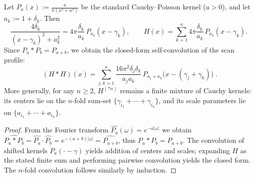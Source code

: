 \begin{proposition}\label{prop:xi-basepoint-scan-cauchy-stable-convolution}
Let \(P_a(x):=\frac{a}{\pi(x^2+a^2)}\) be the standard Cauchy--Poisson kernel (\(a>0\)), and let \(a_k:=1+\delta_k\).
Then
\[
\frac{4\delta_k}{(x-\gamma_k)^2+a_k^2}
=4\pi\frac{\delta_k}{a_k}\,P_{a_k}(x-\gamma_k),
\qquad
H(x)=\sum_{k=1}^{\kappa}4\pi\frac{\delta_k}{a_k}\,P_{a_k}(x-\gamma_k).
\]
Since \(P_a*P_b=P_{a+b}\), we obtain the closed-form self-convolution of the scan profile:
\[
\boxed{\;
(H*H)(x)=
\sum_{j,k=1}^{\kappa}\frac{16\pi^{2}\delta_j\delta_k}{a_ja_k}\,
P_{a_j+a_k}\bigl(x-(\gamma_j+\gamma_k)\bigr)\; }.
\]
More generally, for any \(n\ge 2\), \(H^{(*n)}\) remains a finite mixture of Cauchy kernels: its centers lie on the \(n\)-fold sum-set \(\{\gamma_{i_1}+\cdots+\gamma_{i_n}\}\), and its scale parameters lie on \(\{a_{i_1}+\cdots+a_{i_n}\}\).
\end{proposition}
\begin{proof}
From the Fourier transform \(\widehat{P_a}(\omega)=e^{-a|\omega|}\) we obtain
\(
\widehat{P_a*P_b}=\widehat{P_a}\cdot\widehat{P_b}=e^{-(a+b)|\omega|}=\widehat{P_{a+b}}
\), thus \(P_a*P_b=P_{a+b}\).
The convolution of shifted kernels \(P_a(\cdot-\gamma)\) yields addition of centers and scales; expanding \(H\) as the stated finite sum and performing pairwise convolution yields the closed form. The \(n\)-fold convolution follows similarly by induction.
\end{proof}

\endinput

